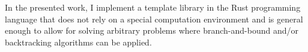 In the presented work, I
implement a template library in the Rust programming language that does not rely
on a special computation environment and is general enough to allow for solving
arbitrary problems where branch-and-bound and/or backtracking algorithms can be applied.




%
%
%
